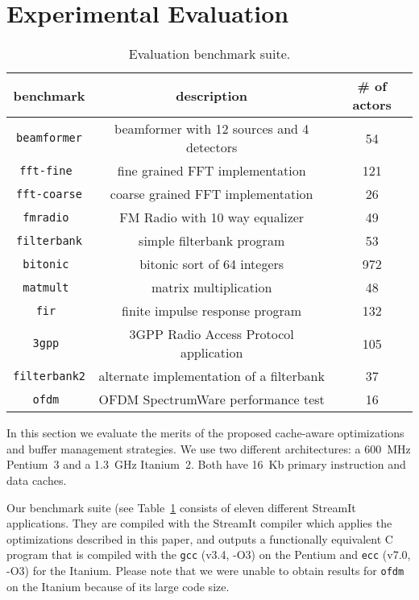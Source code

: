\section{Experimental Evaluation}
\label{sec:evaluation}

\begin{table}[t]
\center
\label{tab:benchmarks}
\vspace{-12pt}
{\tiny
\begin{tabular}{|c|c|c|} \hline
{\bf benchmark}&{\bf description}&{\bf \# of actors}\\ \hline \hline
\texttt{beamformer} &beamformer with 12 sources and 4 detectors& 54 \\ \hline
\texttt{fft-fine	} &fine grained FFT implementation	&	121 \\ \hline
\texttt{fft-coarse} &coarse grained FFT implementation	&	26 \\ \hline
\texttt{fmradio	} &FM Radio with 10 way equalizer	&	49 \\ \hline
\texttt{filterbank} &simple filterbank program	&	53 \\ \hline
\texttt{bitonic	} &bitonic sort of 64 integers	&	972 \\ \hline
\texttt{matmult	} &matrix multiplication	&	48 \\ \hline
\texttt{fir	      } &finite impulse response program	&	132 \\ \hline
\texttt{3gpp	} &3GPP Radio Access Protocol application	&	105 \\ \hline
\texttt{filterbank2}&alternate implementation of a filterbank &	37 \\ \hline
\texttt{ofdm	 }&OFDM SpectrumWare performance test	&	16 \\ \hline
\end{tabular}
}
\vspace{-12pt}
\caption{Evaluation benchmark suite.}
\end{table}


In this section we evaluate the merits of the proposed cache-aware
optimizations and buffer management strategies. We use two
different architectures: a 600~MHz Pentium~3 and a 1.3~GHz
Itanium~2. Both have 16~Kb primary instruction and data caches.

Our benchmark suite (see Table~\ref{tab:benchmarks} consists of eleven
different StreamIt applications. They are compiled with the StreamIt
compiler which applies the optimizations described in this paper, and
outputs a functionally equivalent C program that is compiled with the
\texttt{gcc} (v3.4, -O3) on the Pentium and \texttt{ecc} 
(v7.0, -O3) for the Itanium. Please note that we were unable 
to obtain results for \texttt{ofdm} on the Itanium because of its 
large code size.

